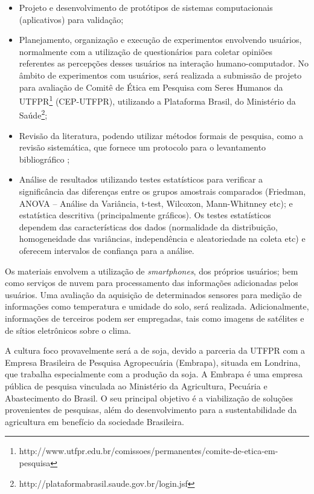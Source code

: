 \documentclass[12pt]{article}
\begin{document}
\begin{itemize}
	\item Projeto e desenvolvimento de protótipos de sistemas computacionais (aplicativos) para validação;
	\item Planejamento, organização e execução de experimentos envolvendo usuários, normalmente com a utilização de questionários para coletar opiniões referentes as percepções desses usuários na interação humano-computador. No âmbito de experimentos com usuários, será realizada a submissão de projeto para avaliação de Comitê de Ética em Pesquisa com Seres Humanos da UTFPR\footnote{http://www.utfpr.edu.br/comissoes/permanentes/comite-de-etica-em-pesquisa} (CEP-UTFPR), utilizando a Plataforma Brasil, do Ministério da Saúde\footnote{http://plataformabrasil.saude.gov.br/login.jsf};
	\item Revisão da literatura, podendo utilizar métodos formais de pesquisa, como a revisão sistemática, que fornece um protocolo para o levantamento bibliográfico \cite{Kitchenham:2004};
	\item Análise de resultados utilizando testes estatísticos para verificar a significância das diferenças entre os grupos amostrais comparados (Friedman, ANOVA – Análise da Variância, t-test, Wilcoxon, Mann-Whitnney etc); e estatística descritiva (principalmente gráficos). Os testes estatísticos dependem das características dos dados (normalidade da distribuição, homogeneidade das variâncias, independência e aleatoriedade na coleta etc) e oferecem intervalos de confiança para a análise.
\end{itemize}

Os materiais envolvem a utilização de \textit{smartphones}, dos próprios usuários; bem como serviços de nuvem para processamento das informações adicionadas pelos usuários. Uma avaliação da aquisição de determinados sensores para medição de informações como temperatura e umidade do solo, será realizada. Adicionalmente, informações de terceiros podem ser empregadas, tais como imagens de satélites e de sítios eletrônicos sobre o clima. 		

A cultura foco provavelmente será a de soja, devido a parceria da UTFPR com a Empresa Brasileira de Pesquisa Agropecuária (Embrapa), situada em Londrina, que trabalha especialmente com a produção da soja. A Embrapa é uma empresa pública de pesquisa vinculada ao Ministério da Agricultura, Pecuária e Abastecimento do Brasil. O seu principal objetivo é a viabilização de soluções provenientes de pesquisas, além do desenvolvimento para a sustentabilidade da agricultura em benefício da sociedade Brasileira. 
\end{document}
